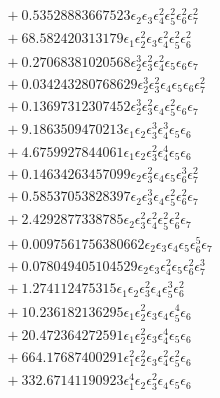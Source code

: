 \documentclass[10pt]{article}
\begin{document}
\begin{align*}
&{}  + 0.53528883667523 \epsilon_{2} \epsilon_{3} \epsilon_{4}^{2} \epsilon_{5}^{2} \epsilon_{6}^{2} \epsilon_{7}^{2} \\
&{}  + 68.582420313179 \epsilon_{1} \epsilon_{2}^{2} \epsilon_{3} \epsilon_{4}^{2} \epsilon_{5}^{2} \epsilon_{6}^{2} \\
&{}  + 0.27068381020568 \epsilon_{2}^{3} \epsilon_{3}^{2} \epsilon_{4}^{2} \epsilon_{5} \epsilon_{6} \epsilon_{7} \\
&{}  + 0.034243280768629 \epsilon_{2}^{3} \epsilon_{3}^{2} \epsilon_{4} \epsilon_{5} \epsilon_{6} \epsilon_{7}^{2} \\
&{}  + 0.13697312307452 \epsilon_{2}^{3} \epsilon_{3}^{2} \epsilon_{4} \epsilon_{5}^{2} \epsilon_{6} \epsilon_{7} \\
&{}  + 9.1863509470213 \epsilon_{1} \epsilon_{2} \epsilon_{3}^{3} \epsilon_{4}^{3} \epsilon_{5} \epsilon_{6} \\
&{}  + 4.6759927844061 \epsilon_{1} \epsilon_{2} \epsilon_{3}^{2} \epsilon_{4}^{4} \epsilon_{5} \epsilon_{6} \\
&{}  + 0.14634263457099 \epsilon_{2} \epsilon_{3}^{2} \epsilon_{4} \epsilon_{5} \epsilon_{6}^{3} \epsilon_{7}^{2} \\
&{}  + 0.58537053828397 \epsilon_{2} \epsilon_{3}^{3} \epsilon_{4} \epsilon_{5}^{2} \epsilon_{6}^{2} \epsilon_{7} \\
&{}  + 2.4292877338785 \epsilon_{2} \epsilon_{3}^{2} \epsilon_{4}^{2} \epsilon_{5}^{2} \epsilon_{6}^{2} \epsilon_{7} \\
&{}  + 0.0097561756380662 \epsilon_{2} \epsilon_{3} \epsilon_{4} \epsilon_{5} \epsilon_{6}^{5} \epsilon_{7} \\
&{}  + 0.078049405104529 \epsilon_{2} \epsilon_{3} \epsilon_{4}^{2} \epsilon_{5} \epsilon_{6}^{2} \epsilon_{7}^{3} \\
&{}  + 1.274112475315 \epsilon_{1} \epsilon_{2} \epsilon_{3}^{2} \epsilon_{4} \epsilon_{5}^{3} \epsilon_{6}^{2} \\
&{}  + 10.236182136295 \epsilon_{1} \epsilon_{2}^{2} \epsilon_{3} \epsilon_{4} \epsilon_{5}^{4} \epsilon_{6} \\
&{}  + 20.472364272591 \epsilon_{1} \epsilon_{2}^{2} \epsilon_{3} \epsilon_{4}^{4} \epsilon_{5} \epsilon_{6} \\
&{}  + 664.17687400291 \epsilon_{1}^{2} \epsilon_{2}^{2} \epsilon_{3} \epsilon_{4}^{2} \epsilon_{5}^{2} \epsilon_{6} \\
&{}  + 332.67141190923 \epsilon_{1}^{4} \epsilon_{2} \epsilon_{3}^{2} \epsilon_{4} \epsilon_{5} \epsilon_{6} \\

\end{align*}
\end{document}
